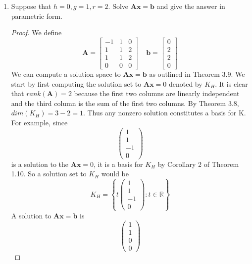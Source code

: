 \documentclass[11pt]{scrartcl}
\begin{document}
\begin{enumerate}[label=\alph*.]
{	      }
	\item{
	      Suppose that $h = 0, g = 1, r = 2$. Solve $\mathbf{Ax=b}$ and give the answer
	      in parametric form.
	      \begin{proof}
		      We define $$\mathbf{A} =
			      \begin{bmatrix}
				      -1 & 1 & 0 \\
				      1  & 1 & 2 \\
				      1  & 1 & 2 \\
				      0  & 0 & 0
			      \end{bmatrix}
			      \quad
			      \mathbf{b} =
			      \begin{bmatrix}
				      0 \\
				      2 \\
				      2 \\
				      0
			      \end{bmatrix}
		      $$
		      We can compute a solution space to $\mathbf{Ax=b}$ as outlined in Theorem 3.9. We start by first computing the
		      solution set to $\mathbf{Ax}=0$ denoted by $K_H$. It is clear that $rank(\mathbf{A}) = 2$ because the first two
		      columns are linearly independent and the third column is the sum of the first two columns.
		      By Theorem 3.8, $dim(K_H) = 3 - 2 = 1$. Thus any nonzero solution constitutes a basis for K. For example, since
		      $$
			      \begin{pmatrix}
				      1 \\
				      1 \\
					  -1  \\
				      0
			      \end{pmatrix}
		      $$
		      is a solution to the $\mathbf{Ax}=0$, it is a basis for $K_H$ by Corollary 2 of Theorem 1.10.
		      So a solution set to $K_H$ would be
		      \[
			      K_H=
			      \left\{
			      t\begin{pmatrix}
				      1  \\
				      1 \\
				      -1  \\
				      0
			      \end{pmatrix}: t \in \mathbb{R}
			      \right\}
		      \]
		      A solution to $\mathbf{Ax=b}$ is
		      $$
			      \begin{pmatrix}
				      1 \\
				      1 \\
				      0 \\
				      0
			      \end{pmatrix}
$$
\end{proof}}
\end{enumerate}
\end{document}
